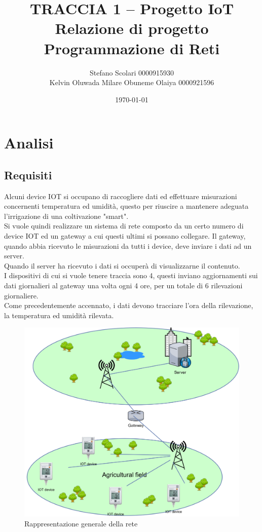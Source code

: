 \documentclass[a4paper,12pt]{report}
\title{\textbf{TRACCIA 1 – Progetto IoT}\\Relazione di progetto\\Programmazione di Reti}
\author{
Stefano Scolari 0000915930 \\
Kelvin Oluwada Milare Obuneme Olaiya 0000921596
}
\date{\today}
\begin{document}
\maketitle

\tableofcontents

\chapter{Analisi}
\section{Requisiti}
Alcuni device IOT si occupano di raccogliere dati ed effettuare misurazioni concernenti temperatura ed umidità, questo per riuscire a mantenere adeguata l'irrigazione di una coltivazione "smart".\\
Si vuole quindi realizzare un sistema di rete composto da un certo numero di device IOT ed un gateway a cui questi ultimi si possano collegare. Il gateway, quando abbia ricevuto le misurazioni da tutti i device, deve inviare i dati ad un server.
\\
Quando il server ha ricevuto i dati si occuperà di visualizzarne il contenuto.
\\
I dispositivi di cui si vuole tenere traccia sono 4, questi inviano aggiornamenti sui dati giornalieri al gateway una volta ogni 4 ore, per un totale di 6 rilevazioni giornaliere.\\
Come precedentemente accennato, i dati devono tracciare l'ora della rilevazione, la temperatura ed umidità rilevata.

\begin{figure}[H]
    \begin{center}
        \centering
        \includegraphics[scale=0.6]{UML/Architecture.png}
    \end{center}
    \caption{Rappresentazione generale della rete}
    \label{img:Architecture}
\end{figure}
\
\\
%
\end{document}
